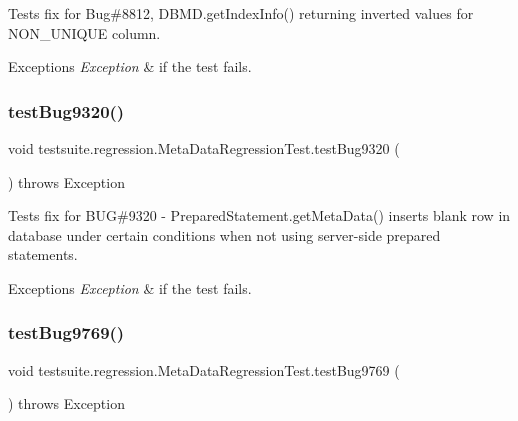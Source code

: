 Tests fix for Bug\#8812, D\+B\+M\+D.\+get\+Index\+Info() returning inverted values for \textquotesingle{}N\+O\+N\+\_\+\+U\+N\+I\+Q\+UE\textquotesingle{} column.


\begin{DoxyExceptions}{Exceptions}
{\em Exception} & if the test fails. \\
\hline
\end{DoxyExceptions}
\mbox{\label{classtestsuite_1_1regression_1_1_meta_data_regression_test_a85b0332eeddf0448a8813e9e572be277}} 
\subsubsection{\texorpdfstring{test\+Bug9320()}{testBug9320()}}
{\footnotesize\ttfamily void testsuite.\+regression.\+Meta\+Data\+Regression\+Test.\+test\+Bug9320 (\begin{DoxyParamCaption}{ }\end{DoxyParamCaption}) throws Exception}

Tests fix for B\+UG\#9320 -\/ Prepared\+Statement.\+get\+Meta\+Data() inserts blank row in database under certain conditions when not using server-\/side prepared statements.


\begin{DoxyExceptions}{Exceptions}
{\em Exception} & if the test fails. \\
\hline
\end{DoxyExceptions}
\mbox{\label{classtestsuite_1_1regression_1_1_meta_data_regression_test_aaeda7a5f9b968ba3bb866fb2fb62b75c}} 
\subsubsection{\texorpdfstring{test\+Bug9769()}{testBug9769()}}
{\footnotesize\ttfamily void testsuite.\+regression.\+Meta\+Data\+Regression\+Test.\+test\+Bug9769 (\begin{DoxyParamCaption}{ }\end{DoxyParamCaption}) throws Exception}

